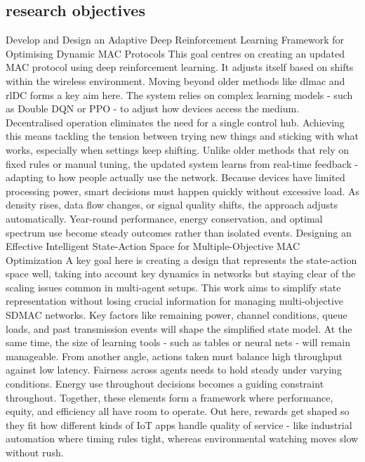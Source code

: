 \documentclass[a4paper,fleqn]{cas-dc}
\numberwithin{equation}{section}
\begin{document}
\subsection{research objectives}
Develop and Design an Adaptive Deep Reinforcement Learning Framework for Optimising Dynamic MAC Protocols
This goal centres on creating an updated MAC protocol using deep reinforcement learning. It adjusts itself based on shifts within the wireless environment. Moving beyond older methods like dlmac and rlDC forms a key aim here. The system relies on complex learning models - such as Double DQN or PPO - to adjust how devices access the medium. Decentralised operation eliminates the need for a single control hub. Achieving this means tackling the tension between trying new things and sticking with what works, especially when settings keep shifting. Unlike older methods that rely on fixed rules or manual tuning, the updated system learns from real-time feedback - adapting to how people actually use the network. Because devices have limited processing power, smart decisions must happen quickly without excessive load. As density rises, data flow changes, or signal quality shifts, the approach adjusts automatically. Year-round performance, energy conservation, and optimal spectrum use become steady outcomes rather than isolated events.\cite{Ni2024138519}\cite{Kim202412918}
Designing an Effective Intelligent State-Action Space for Multiple-Objective MAC Optimization
A key goal here is creating a design that represents the state-action space well, taking into account key dynamics in networks but staying clear of the scaling issues common in multi-agent setups. This work aims to simplify state representation without losing crucial information for managing multi-objective SDMAC networks. Key factors like remaining power, channel conditions, queue loads, and past transmission events will shape the simplified state model. At the same time, the size of learning tools - such as tables or neural nets - will remain manageable. From another angle, actions taken must balance high throughput against low latency. Fairness across agents needs to hold steady under varying conditions. Energy use throughout decisions becomes a guiding constraint throughout. Together, these elements form a framework where performance, equity, and efficiency all have room to operate. Out here, rewards get shaped so they fit how different kinds of IoT apps handle quality of service - like industrial automation where timing rules tight, whereas environmental watching moves slow without rush.\cite{Kim2024}\cite{Kim202412918}
\end{document}
